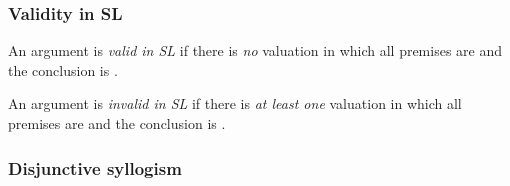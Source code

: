 \begin{frame}
  \frametitle{Validity in SL}

  \begin{definition}
  An argument is \emph{valid in SL} if there is \emph{no} valuation in which
  all premises are \True{} and the conclusion is \False.

  An argument is \emph{invalid in SL} if there is \emph{at least one}
  valuation in which all premises are \True{} and the conclusion is
  \False.
  \end{definition}
\end{frame}

\begin{frame}
  \frametitle{Disjunctive syllogism}



\end{frame}
